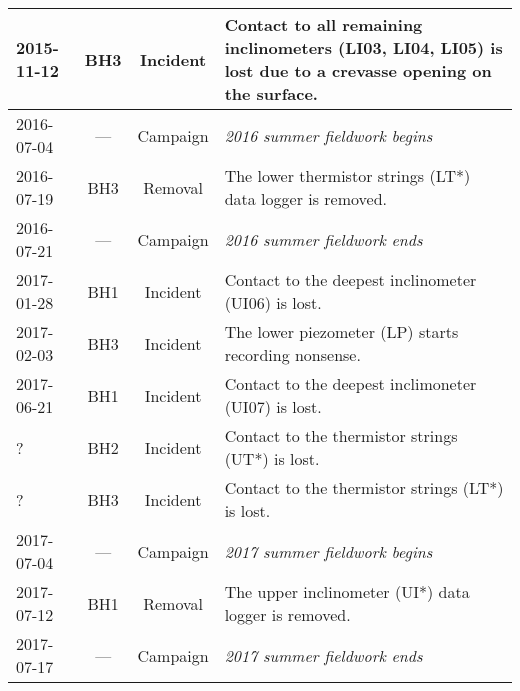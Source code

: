 \documentclass[utf8]{article}
\begin{document}
\begin{table}
{\begin{tabular}{lccp{95mm}}
        2015-11-12 & BH3  & Incident & Contact to all remaining inclinometers
                                       (LI03, LI04, LI05) is lost due to
                                       a crevasse opening on the surface. \\
        \hline
        2016-07-04 & ---  & Campaign & \emph{2016 summer fieldwork begins} \\
        2016-07-19 & BH3  & Removal  & The lower thermistor strings (LT*) data
                                       logger is removed. \\
        2016-07-21 & ---  & Campaign & \emph{2016 summer fieldwork ends} \\
        \hline
        2017-01-28 & BH1  & Incident & Contact to the deepest inclinometer
                                       (UI06) is lost. \\
        2017-02-03 & BH3  & Incident & The lower piezometer (LP) starts
                                       recording nonsense. \\
        2017-06-21 & BH1  & Incident & Contact to the deepest inclimoneter
                                       (UI07) is lost. \\
        ?          & BH2  & Incident & Contact to the thermistor strings (UT*)
                                       is lost. \\
        ?          & BH3  & Incident & Contact to the thermistor strings (LT*)
                                       is lost. \\
        \hline
        2017-07-04 & ---  & Campaign & \emph{2017 summer fieldwork begins} \\
        2017-07-12 & BH1  & Removal  & The upper inclinometer (UI*) data logger
                                       is removed. \\
        2017-07-17 & ---  & Campaign & \emph{2017 summer fieldwork ends} \\
        \hline
      \end{tabular}}
    \end{table}
\end{document}
